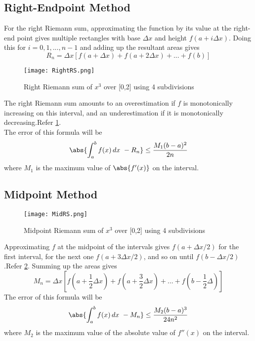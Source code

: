 \documentclass[a4paper, 12pt]{report}
\begin{document}
    \subsection{Right-Endpoint Method}
    For the right Riemann sum, approximating the function by its value at the right-end point gives multiple rectangles with base $\Delta x$ and height $f(a+i\Delta x)$. Doing this for $i = 0,1,...,n-1$ and adding up the resultant areas gives
    \begin{equation}
        R_{n} = \Delta x[f(a+\Delta x) +  f(a+2\Delta x) + ...+ f(b)]
    \end{equation}
    \begin{figure}[!h]
    \centering
    \texttt{[image: RightRS.png]}
    \caption{Right Riemann sum of $x^{3}$ over [0,2] using 4 subdivisions}
    \label{fig:RightRS}
    \end{figure}
    The right Riemann sum amounts to an overestimation if $f$ is monotonically increasing on this interval, and an underestimation if it is monotonically decreasing.Refer \ref{fig:RightRS}.\\
    The error of this formula will be 
    \begin{equation}
        \abs{ \int_{a}^{b} f(x)\,dx\  - R_{n}} \leq \frac{M_{1}(b-a)^{2}}{2n}
    \end{equation}
    where $M_{1}$ is the maximum value of $\abs{f'(x)}$ on the interval.
    \subsection{Midpoint Method}
    \begin{figure}[!h]
    \centering
    \texttt{[image: MidRS.png]}
    \caption{Midpoint Riemann sum of $x^{3}$ over [0,2] using 4 subdivisions}
    \label{fig:MidRS}
    \end{figure}
    Approximating $f$ at the midpoint of the intervals gives $f(a+\Delta x /2)$ for the first interval, for the next one $f(a+3\Delta x /2)$, and so on until $f(b-\Delta x /2)$.Refer \ref{fig:MidRS}. Summing up the areas gives
    \begin{equation}
        M_{n} = \Delta x[f(a+\frac{1}{2}\Delta x ) +  f(a+\frac{3}{2}\Delta x ) + ...+ f(b-\frac{1}{2}\Delta)]
    \end{equation}
    The error of this formula will be
     \begin{equation}
        \abs{ \int_{a}^{b} f(x)\,dx\  - M_{n}} \leq \frac{M_{2}(b-a)^{3}}{24n^{2}}
    \end{equation}
    where $M_{2}$ is the maximum value of the absolute value of $f''(x)$ on the interval.
   
\end{document}

